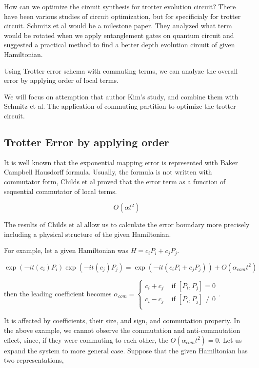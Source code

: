 \documentclass[a4paper,12pt]{article}
\begin{document}
How can we optimize the circuit synthesis for trotter evolution circuit?
There have been various studies of circuit optimization, 
but for specificialy for trotter circuit. 
Schmitz et al would be a milestone paper\cite{schmitz_graph_2023}.
They analyzed what term would be rotated when we apply entanglement gates 
on quantum circuit and suggested a practical method to find a better depth
evolution circuit of given Hamiltonian.

Using Trotter error schema with commuting terms, 
we can analyze the overall error by applying order of local terms.

We will focus on attemption that author Kim's study, and 
combine them with Schmitz et al. 
The application of commuting partition to optimize 
the trotter circuit.

\subsection{Trotter Error by applying order}

It is well known that the exponential mapping error is represented with Baker Campbell Hausdorff formula.
Usually, the formula is not written with commutator form, Childs et al proved that the error term 
as a function of sequential commutator of local terms\cite{childs_theory_2021}.

\begin{equation}
    O(\alpha t^2)
\end{equation}

The results of Childs et al allow us to calculate 
the error boundary more precisely including a physical structure 
of the given Hamiltonian.

For example, let a given Hamiltonian was $H = c_i P_i + c_j P_j$.

\begin{equation}
    \exp(-it (c_i) P_i) \exp(-it (c_j) P_j) = \exp(- it (c_i P_i + c_j P_j)) + O (\alpha_{com}t^2)
\end{equation}

then the leading coefficient becomes $\alpha_{com} = \begin{cases}
    c_i + c_j & \mbox{ if } [P_i, P_j] = 0 \\
    c_i - c_j & \mbox{ if } [P_i, P_j] \neq 0 \\
\end{cases}$.

It is affected by coefficients, their size, and sign, and commutation property.
In the above example, we cannot observe the commutation and anti-commutation
effect, since, if they were commuting to each other, the $O(\alpha_{com} t^2) = 0$.
Let us expand the system to more general case.
Suppose that the given Hamiltonian has two representations,
\end{document}
